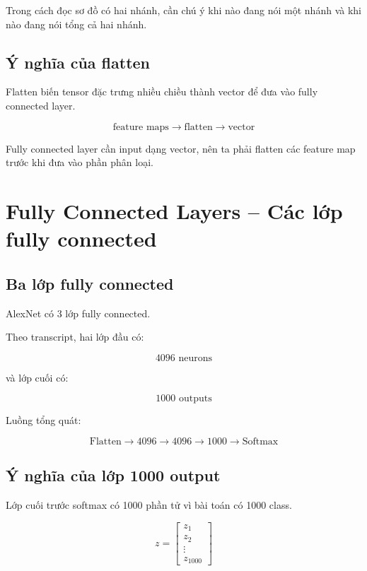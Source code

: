 \begin{luuy}
Trong cách đọc sơ đồ có hai nhánh, cần chú ý khi nào đang nói một nhánh và khi nào đang nói tổng cả hai nhánh.
\end{luuy}

\subsection{Ý nghĩa của flatten}

Flatten biến tensor đặc trưng nhiều chiều thành vector để đưa vào fully connected layer.

\[
    \text{feature maps}
    \rightarrow
    \text{flatten}
    \rightarrow
    \text{vector}
\]

\begin{ghinho}
Fully connected layer cần input dạng vector, nên ta phải flatten các feature map trước khi đưa vào phần phân loại.
\end{ghinho}

\section{Fully Connected Layers -- Các lớp fully connected}

\subsection{Ba lớp fully connected}

AlexNet có 3 lớp fully connected.

Theo transcript, hai lớp đầu có:

\[
    4096 \text{ neurons}
\]

và lớp cuối có:

\[
    1000 \text{ outputs}
\]

Luồng tổng quát:

\[
    \text{Flatten}
    \rightarrow
    4096
    \rightarrow
    4096
    \rightarrow
    1000
    \rightarrow
    \text{Softmax}
\]

\subsection{Ý nghĩa của lớp 1000 output}

Lớp cuối trước softmax có 1000 phần tử vì bài toán có 1000 class.

\[
    z =
    \begin{bmatrix}
    z_1\\
    z_2\\
    \vdots\\
    z_{1000}
    \end{bmatrix}
\]

